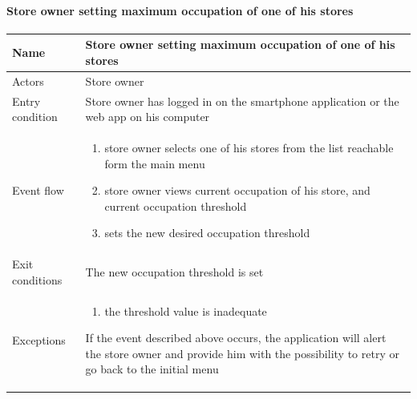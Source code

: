 \paragraph{Store owner setting maximum occupation of one of his stores}
\begin{flushleft}
	\begin{tabular} { | m{3cm} | m{10cm} | }
		\hline
		Name & Store owner setting maximum occupation of one of his stores\\
		\hline
		Actors & Store owner\\
		\hline
		Entry condition & Store owner has logged in on the smartphone application or the web app on his computer\\
		\hline
		Event flow & \begin{enumerate}
			\item store owner selects one of his stores from the list reachable form the main menu
			\item store owner views current occupation of his store, and current occupation threshold
			\item sets the new desired occupation threshold
		\end{enumerate}\\
		\hline
		Exit conditions & The new occupation threshold is set\\
		\hline
		Exceptions & \begin{enumerate}
			\item the threshold value is inadequate
		\end{enumerate}
		If the event described above occurs, the application will alert the store owner and provide him with the possibility to retry or go back to the initial menu\\
		\hline
	\end{tabular}
\end{flushleft}
